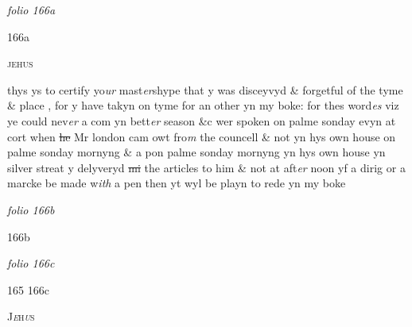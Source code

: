 \documentclass[12pt, a4paper]{book}
\begin{document}
 		
				\marginpar[\vspace{0.5cm}{\textcolor{Gray}{manicule}}]{}
			
 	
               
\dotfill
						\newpage
{}

\textit{folio 166a}


\begin{flushright}{\color{Gray}166a}\end{flushright}
 	
 		
				\begin{center}  {\scshape 
 			jehus
			
 		}  \end{center}
			
 		
 			
		\ifthenelse{\isodd{\thepage}}
		{\reversemarginpar}
		{\normalmarginpar}
		thys ys to certify yo\textit{ur} mast\textit{er}shype that y was disceyvyd \& forgetful of the tyme \& place
			, for y have takyn on tyme for an other yn my boke: for thes word\textit{es} viz ye could nev\textit{er} a com yn bett\textit{er} season \&c wer spoken on palme sonday evyn at cort when \sout{he}
               Mr london 
			cam owt fro\textit{m} the councell \& not yn hys own house on palme sonday mornyng \& a pon palme sonday mornyng yn hys own house yn silver streat y delyveryd \sout{mi} the articles to him \& not at aft\textit{er }noon yf a dirig or a marcke be made w\textit{ith} a pen then  yt wyl be playn to rede yn my boke
			
 		
 	

\dotfill
						\newpage
{}

\textit{folio 166b}


 	\begin{flushright}{\color{Gray}166b}\end{flushright}

\dotfill
						\newpage
{}

\textit{folio 166c}


 	\begin{flushright}{\color{Mahogany}165} {\color{Gray}166c}\end{flushright}
 	
 		
				\begin{center}  {\scshape J\textit{e}h\textit{u}s}  \end{center}
			
\end{document}
